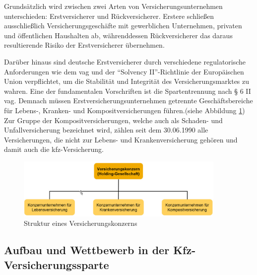 Grundsätzlich wird zwischen zwei Arten von Versicherungsunternehmen unterschieden: Erstversicherer und Rückversicherer. Erstere schließen ausschließlich Versicherungsgeschäfte mit gewerblichen Unternehmen, privaten und öffentlichen Haushalten ab, währenddessen Rückversicherer das daraus resultierende Risiko der Erstversicherer übernehmen.\autocite[Vgl.][S. 240f.]{FARNY2011} 


Darüber hinaus sind deutsche Erstversicherer durch verschiedene regulatorische Anforderungen wie dem \ac{vag} und der \enquote{Solvency II}-Richtlinie der Europäischen Union verpflichtet, um die Stabilität und Integrität des Versicherungsmarktes zu wahren. \autocite[Vgl.][]{BAFIN2016} Eine der fundamentalen Vorschriften ist die Spartentrennung nach § 6 II \ac{vag}. Demnach müssen Erstversicherungsunternehmen getrennte Geschäftsbereiche für Lebens-, Kranken- und Kompositversicherungen führen.(siehe Abbildung \ref{fig:StVKonzern}) Zur Gruppe der Kompositversicherungen, welche auch als Schaden- und Unfallversicherung bezeichnet wird, zählen seit dem 30.06.1990 alle Versicherungen, die nicht zur Lebens- und Krankenversicherung gehören und damit auch die \ac{kfz}-Versicherung. \autocite[Vgl.][S. 241-243]{FARNY2011} 

\begin{figure}[h]
  \centering
    \includegraphics[width=0.9\textwidth]{img/Struktur_VKonzern3.jpg}
    \caption[Struktur eines Versicherungskonzerns]{Struktur eines Versicherungskonzerns\autocite{StVKonzern}}
   \label{fig:StVKonzern}
\end{figure}




\subsection{Aufbau und Wettbewerb in der Kfz-Versicherungssparte}

